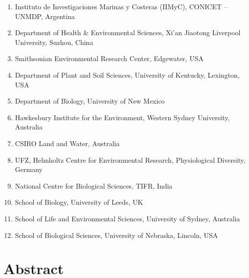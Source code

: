 \documentclass[twoside,12pt,final]{ucthesis-CA2012}
\begin{document}
\begin{ucmainmatter}
\begin{enumerate}
\item
  Instituto de Investigaciones Marinas y Costeras (IIMyC), CONICET -- UNMDP, Argentina
\item
  Department of Health \& Environmental Sciences, Xi'an Jiaotong Liverpool University, Suzhou, China
\item
  Smithsonian Environmental Research Center, Edgewater, USA
\item
  Department of Plant and Soil Sciences, University of Kentucky, Lexington, USA
\item
  Department of Biology, University of New Mexico
\item
  Hawkesbury Institute for the Environment, Western Sydney University, Australia
\item
  CSIRO Land and Water, Australia
\item
  UFZ, Helmholtz Centre for Environmental Research, Physiological Diversity, Germany
\item
  National Centre for Biological Sciences, TIFR, India
\item
  School of Biology, University of Leeds, UK
\item
  School of Life and Environmental Sciences, University of Sydney, Australia
\item
  School of Biological Sciences, University of Nebraska, Lincoln, USA
\end{enumerate}
\hypertarget{abstract}{%
\section{Abstract}\label{abstract}}


\end{ucmainmatter}
\end{document}
